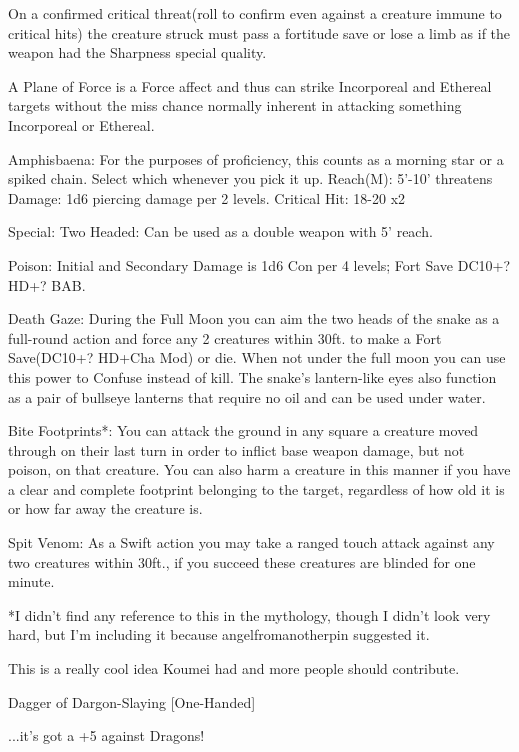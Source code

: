 On a confirmed critical threat(roll to confirm even against a creature immune to critical hits) the creature struck must pass a fortitude save or lose a limb as if the weapon had the Sharpness special quality.

A Plane of Force is a Force affect and thus can strike Incorporeal and Ethereal targets without the miss chance normally inherent in attacking something Incorporeal or Ethereal.


Amphisbaena:
For the purposes of proficiency, this counts as a morning star or a spiked chain. Select which whenever you pick it up.
Reach(M): 5'-10' threatens
Damage: 1d6 piercing damage per 2 levels.
Critical Hit: 18-20 x2

Special:
Two Headed: Can be used as a double weapon with 5' reach.

Poison: Initial and Secondary Damage is 1d6 Con per 4 levels; Fort Save DC10+? HD+? BAB.

Death Gaze: During the Full Moon you can aim the two heads of the snake as a full-round action and force any 2 creatures within 30ft. to make a Fort Save(DC10+? HD+Cha Mod) or die. When not under the full moon you can use this power to Confuse instead of kill. The snake's lantern-like eyes also function as a pair of bullseye lanterns that require no oil and can be used under water.

Bite Footprints*: You can attack the ground in any square a creature moved through on their last turn in order to inflict base weapon damage, but not poison, on that creature. You can also harm a creature in this manner if you have a clear and complete footprint belonging to the target, regardless of how old it is or how far away the creature is.

Spit Venom: As a Swift action you may take a ranged touch attack against any two creatures within 30ft., if you succeed these creatures are blinded for one minute.

*I didn't find any reference to this in the mythology, though I didn't look very hard, but I'm including it because angelfromanotherpin suggested it.

This is a really cool idea Koumei had and more people should contribute.










Dagger of Dargon-Slaying [One-Handed]

...it's got a +5 against Dragons!

